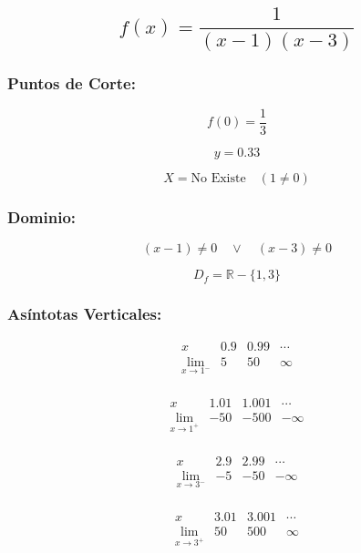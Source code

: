 \begin{center}
    
\end{center}


\subsection*{\[f(x) = \frac{1}{(x-1)(x-3)}\]}

\subsubsection*{Puntos de Corte:}

\[
f(0) = \frac{1}{3}
\]

\[
y = 0.33
\]

\[
X = \text{No Existe} \quad (1 \neq 0)
\]

\subsubsection*{Dominio:}

\[
(x-1) \neq 0 \quad \vee \quad (x-3) \neq 0
\]

\[
D_f = \mathbb{R} - \{1,3\}
\]

\subsubsection*{Asíntotas Verticales:}

\[
\begin{array}{c|c|c|c}
x & 0.9 & 0.99 & \cdots \\
\hline
\lim_{x \to 1^-} & 5 & 50 & \infty \\
\end{array}
\]

\[
\begin{array}{c|c|c|c}
x & 1.01 & 1.001 & \cdots \\
\hline
\lim_{x \to 1^+} & -50 & -500 & -\infty \\
\end{array}
\]

\[
\begin{array}{c|c|c|c}
x & 2.9 & 2.99 & \cdots \\
\hline
\lim_{x \to 3^-} & -5 & -50 & -\infty \\
\end{array}
\]

\[
\begin{array}{c|c|c|c}
x & 3.01 & 3.001 & \cdots \\
\hline
\lim_{x \to 3^+} & 50 & 500 & \infty \\
\end{array}
\]



